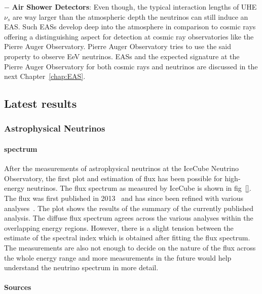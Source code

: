 \begin{description}
  \item $-$ \textbf{Air Shower Detectors}: Even though, the typical interaction lengths of UHE$\nu_s$ are way larger than the atmospheric depth the neutrinos can still induce an EAS. Such EASs develop deep into the atmosphere in comparison to cosmic rays offering a distinguishing aspect for detection at cosmic ray observatories like the Pierre Auger Observatory. Pierre Auger Observatory tries to use the said property to observe EeV neutrinos. EASs and the expected signature at the Pierre Auger Observatory for both cosmic rays and neutrinos are discussed in the next Chapter~\ref{chap:EAS}.   

  \end{description}

\subsection{Latest results}
  \label{subsec:Nuresults}
  
\subsubsection*{Astrophysical Neutrinos}
  
  \paragraph*{spectrum}
    \label{subsubsec:Nuspectrum}
  After the measurements of astrophysical neutrinos at the IceCube Neutrino Observatory, the first plot and estimation of flux has been possible for high-energy neutrinos. The flux spectrum as measured by IceCube is shown in fig~\ref{}. The flux was first published in 2013~\cite{Aartsen_2014_first_flux} and has since been refined with various analyses~\cite{PhysRevD.110.022001}. The plot shows the results of the summary of the currently published analysis. The diffuse flux spectrum agrees across the various analyses within the overlapping energy regions. However, there is a slight tension between the estimate of the spectral index which is obtained after fitting the flux spectrum. The measurements are also not enough to decide on the nature of the flux across the whole energy range and more measurements in the future would help understand the neutrino spectrum in more detail. 

  \paragraph*{Sources}
    \label{subsubsec:Nusources}
  
